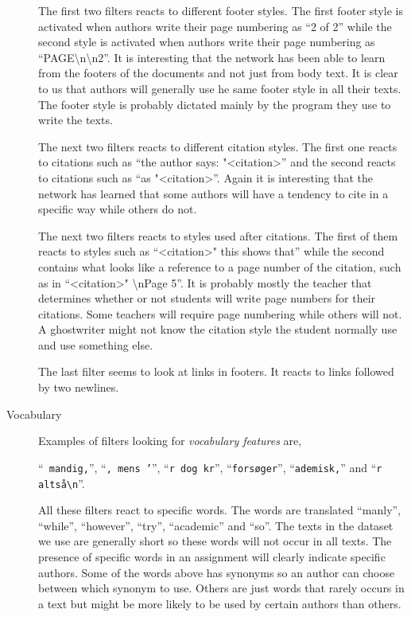 \begin{description}
        The first two filters reacts to different footer styles. The first
        footer style is activated when authors write their page numbering as
        ``2 of 2'' while the second style is activated when authors write their
        page numbering as ``PAGE\textbackslash n\textbackslash n2''. It is
        interesting that the network has been able to learn from the footers
        of the documents and not just from body text. It is clear to us that
        authors will generally use he same footer style in all their texts. The
        footer style is probably dictated mainly by the program they use to
        write the texts.

        The next two filters reacts to different citation styles. The first
        one reacts to citations such as ``the author says: "<citation>'' and
        the second reacts to citations such as ``as "<citation>''. Again it is
        interesting that the network has learned that some authors will have a
        tendency to cite in a specific way while others do not.

        The next two filters reacts to styles used after citations. The first
        of them reacts to styles such as ``<citation>" this shows that'' while
        the second contains what looks like a reference to a page number of
        the citation, such as in ``<citation>" \textbackslash nPage 5''. It is
        probably mostly the teacher that determines whether or not students
        will write page numbers for their citations. Some teachers will require
        page numbering while others will not. A ghostwriter might not know the
        citation style the student normally use and use something else.

        The last filter seems to look at links in footers. It reacts to links
        followed by two newlines.

    \item[Vocabulary]

        Examples of filters looking for \textit{vocabulary features} are,

        ``\verb| mandig,|'', ``\verb|, mens ’|'', ``\verb|r dog kr|'',
        ``\verb|forsøger|'', ``\verb|ademisk,|'' and ``\verb|r altså\n|''.

        All these filters react to specific words. The words are translated
        ``manly'', ``while'', ``however'', ``try'', ``academic'' and ``so''. The
        texts in the dataset we use are generally short so these words will not
        occur in all texts. The presence of specific words in an assignment will
        clearly indicate specific authors. Some of the words above has synonyms
        so an author can choose between which synonym to use. Others are just
        words that rarely occurs in a text but might be more likely to be used
        by certain authors than others.


\end{description}
